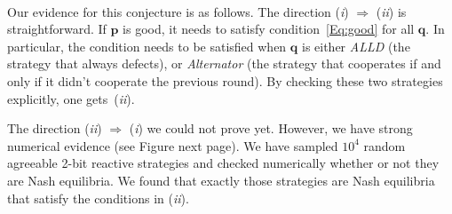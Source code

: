 \documentclass{article}
\theoremstyle{definition}
\begin{document}
~\\
Our evidence for this conjecture is as follows. The direction ({\it i}) $\Rightarrow$ ({\it ii}) is straightforward. If $\mathbf{p}$ is good, it needs to satisfy condition~\eqref{Eq:good} for all $\mathbf{q}$. In particular, the condition needs to be satisfied when $\mathbf{q}$ is either \emph{ALLD} (the strategy that always defects), or \emph{Alternator} (the strategy that cooperates if and only if it didn't cooperate the previous round). By checking these two strategies explicitly, one gets~({\it ii}). 

The direction  ({\it ii}) $\Rightarrow$ ({\it i}) we could not prove yet. However, we have strong numerical evidence (see Figure next page). We have sampled $10^4$ random agreeable 2-bit reactive strategies and checked numerically whether or not they are Nash equilibria. We found that exactly those strategies are Nash equilibria that satisfy the conditions in ({\it ii}).
\end{document}

